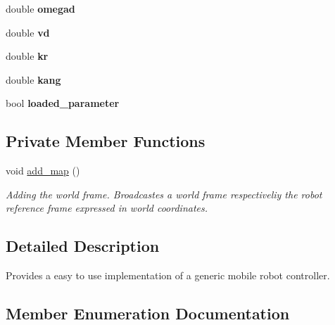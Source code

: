 \begin{DoxyCompactItemize}
\item 
double {\bfseries omegad}\hypertarget{classController_af75dc7cabc84c25933aec4e42bd9533a}{}\label{classController_af75dc7cabc84c25933aec4e42bd9533a}

\item 
double {\bfseries vd}\hypertarget{classController_ad67f667a4fcbcfc6cd74e9dec88b6f98}{}\label{classController_ad67f667a4fcbcfc6cd74e9dec88b6f98}

\item 
double {\bfseries kr}\hypertarget{classController_ab107c130b9466fd6d7116306218b4a95}{}\label{classController_ab107c130b9466fd6d7116306218b4a95}

\item 
double {\bfseries kang}\hypertarget{classController_a9b8aa757ac74e51a1bb6fc959ffc5a14}{}\label{classController_a9b8aa757ac74e51a1bb6fc959ffc5a14}

\item 
bool {\bfseries loaded\+\_\+parameter}\hypertarget{classController_a4e0e569456498e5670a48244c22cafc9}{}\label{classController_a4e0e569456498e5670a48244c22cafc9}

\end{DoxyCompactItemize}
\subsection*{Private Member Functions}
\begin{DoxyCompactItemize}
\item 
void \hyperlink{classController_ac3c2cc7b8afdf05ade60e03eaca88b91}{add\+\_\+map} ()\hypertarget{classController_ac3c2cc7b8afdf05ade60e03eaca88b91}{}\label{classController_ac3c2cc7b8afdf05ade60e03eaca88b91}

\begin{DoxyCompactList}\small\item\em Adding the world frame. Broadcastes a world frame respectiveliy the robot reference frame expressed in world coordinates. \end{DoxyCompactList}\end{DoxyCompactItemize}


\subsection{Detailed Description}
Provides a easy to use implementation of a generic mobile robot controller. 

\subsection{Member Enumeration Documentation}
